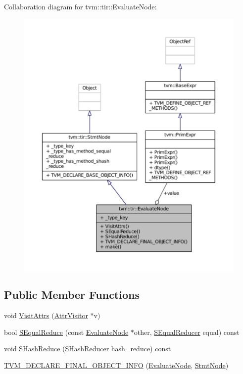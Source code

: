 Collaboration diagram for tvm\+:\+:tir\+:\+:Evaluate\+Node\+:
\nopagebreak
\begin{figure}[H]
\begin{center}
\leavevmode
\includegraphics[width=350pt]{classtvm_1_1tir_1_1EvaluateNode__coll__graph}
\end{center}
\end{figure}
\subsection*{Public Member Functions}
\begin{DoxyCompactItemize}
\item 
void \hyperlink{classtvm_1_1tir_1_1EvaluateNode_a3950633f2ab07c83010e7a489d67d0e2}{Visit\+Attrs} (\hyperlink{classtvm_1_1AttrVisitor}{Attr\+Visitor} $\ast$v)
\item 
bool \hyperlink{classtvm_1_1tir_1_1EvaluateNode_adee5957be3a1dd8f0b6e7387f4c81d7d}{S\+Equal\+Reduce} (const \hyperlink{classtvm_1_1tir_1_1EvaluateNode}{Evaluate\+Node} $\ast$other, \hyperlink{classtvm_1_1SEqualReducer}{S\+Equal\+Reducer} equal) const 
\item 
void \hyperlink{classtvm_1_1tir_1_1EvaluateNode_aa24892a4822d2707ca79757aa168435b}{S\+Hash\+Reduce} (\hyperlink{classtvm_1_1SHashReducer}{S\+Hash\+Reducer} hash\+\_\+reduce) const 
\item 
\hyperlink{classtvm_1_1tir_1_1EvaluateNode_a6124f7d5e719d1225bfb29d32d6dcea4}{T\+V\+M\+\_\+\+D\+E\+C\+L\+A\+R\+E\+\_\+\+F\+I\+N\+A\+L\+\_\+\+O\+B\+J\+E\+C\+T\+\_\+\+I\+N\+FO} (\hyperlink{classtvm_1_1tir_1_1EvaluateNode}{Evaluate\+Node}, \hyperlink{classtvm_1_1tir_1_1StmtNode}{Stmt\+Node})
\end{DoxyCompactItemize}

